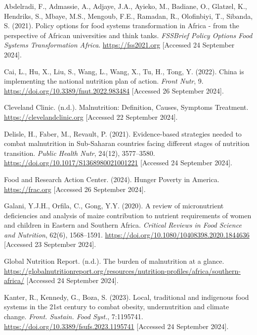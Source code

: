 \documentclass[a4paper,11pt]{report}
\begin{document}
	\begin{thebibliography}
	Abdelradi, F., Admassie, A., Adjaye, J.A., Ayieko, M., Badiane, O., Glatzel, K., Hendriks, S., Mbaye, M.S., Mengoub, F.E., Ramadan, R., Olofinbiyi, T., Sibanda, S. (2021). Policy options for food systems transformation in Africa - from the perspective of African universities and think tanks. \textit{FSSBrief Policy Options Food Systems Transformation Africa}. \url{https://fss2021.org} [Accessed 24 September 2024].
	
	Cai, L., Hu, X., Liu, S., Wang, L., Wang, X., Tu, H., Tong, Y. (2022). China is implementing the national nutrition plan of action. \textit{Front Nutr}, 9. \url{https://doi.org/10.3389/fnut.2022.983484} [Accessed 26 September 2024].
	
	Cleveland Clinic. (n.d.). Malnutrition: Definition, Causes, Symptoms Treatment. \url{https://clevelandclinic.org} [Accessed 22 September 2024].
	
	Delisle, H., Faber, M., Revault, P. (2021). Evidence-based strategies needed to combat malnutrition in Sub-Saharan countries facing different stages of nutrition transition. \textit{Public Health Nutr}, 24(12), 3577–3580. \url{https://doi.org/10.1017/S1368980021001221} [Accessed 24 September 2024].
	
	Food and Research Action Center. (2024). Hunger Poverty in America. \url{https://frac.org} [Accessed 26 September 2024].
	
	Galani, Y.J.H., Orfila, C., Gong, Y.Y. (2020). A review of micronutrient deficiencies and analysis of maize contribution to nutrient requirements of women and children in Eastern and Southern Africa. \textit{Critical Reviews in Food Science and Nutrition}, 62(6), 1568–1591. \url{https://doi.org/10.1080/10408398.2020.1844636} [Accessed 23 September 2024].
	
	Global Nutrition Report. (n.d.). The burden of malnutrition at a glance. \url{https://globalnutritionreport.org/resources/nutrition-profiles/africa/southern-africa/} [Accessed 24 September 2024].
	
	Kanter, R., Kennedy, G., Boza, S. (2023). Local, traditional and indigenous food systems in the 21st century to combat obesity, undernutrition and climate change. \textit{Front. Sustain. Food Syst.}, 7:1195741. \url{https://doi.org/10.3389/fsufs.2023.1195741} [Accessed 24 September 2024].
	

\end{thebibliography}
\end{document}
